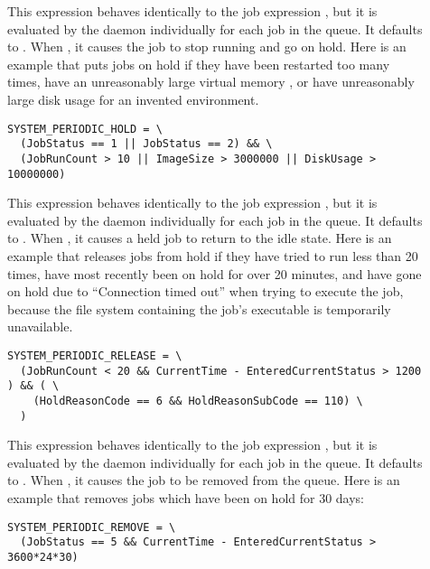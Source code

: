 \begin{description}
\item[]
  \label{param:SystemPeriodicHold} This expression behaves identically
  to the job expression , but it is evaluated by
  the  daemon individually for each job in the queue.
  It defaults to .
  When , it causes the job to stop running and go on hold.
  Here is an
  example that puts jobs on hold if they have been restarted too many
  times, have an unreasonably large virtual memory , or have
  unreasonably large disk usage for an invented environment.

\footnotesize
\begin{verbatim}
SYSTEM_PERIODIC_HOLD = \
  (JobStatus == 1 || JobStatus == 2) && \
  (JobRunCount > 10 || ImageSize > 3000000 || DiskUsage > 10000000)
\end{verbatim}
\normalsize

\item[]
  \label{param:SystemPeriodicRelease} This expression behaves identically
  to the job expression , but it is evaluated by
  the \Condor{schedd} daemon individually for each job in the queue.
  It defaults to \Expr{False}.
  When \Expr{True}, it causes a held job to return to the idle state.
  Here is an example
  that releases jobs from hold if they have tried to run less than 20
  times, have most recently been on hold for over 20 minutes, and have
  gone on hold due to ``Connection timed out'' when trying to execute
  the job, because the file system containing the job's executable is
  temporarily unavailable.

\footnotesize
\begin{verbatim}
SYSTEM_PERIODIC_RELEASE = \
  (JobRunCount < 20 && CurrentTime - EnteredCurrentStatus > 1200 ) && ( \
    (HoldReasonCode == 6 && HoldReasonSubCode == 110) \
  )
\end{verbatim} 
\normalsize


\item[]
  \label{param:SystemPeriodicRemove} This expression behaves identically
  to the job expression , but it is evaluated by
  the  daemon individually for each job in the queue.
  It defaults to .
  When \Expr{True}, it causes the job to be removed from the queue.
  Here is an example
  that removes jobs which have been on hold for 30 days:

\footnotesize
\begin{verbatim}
SYSTEM_PERIODIC_REMOVE = \
  (JobStatus == 5 && CurrentTime - EnteredCurrentStatus > 3600*24*30)
\end{verbatim}
\normalsize


\end{description}
